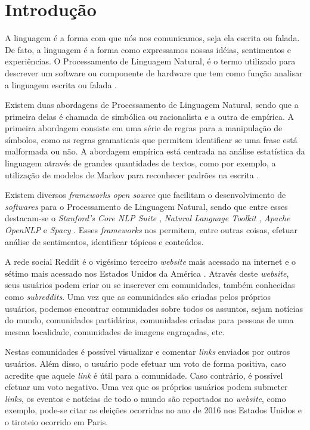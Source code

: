 \chapter{Introdução}
\label{chap:introducao}
A linguagem é a forma com que nós nos comunicamos, seja ela escrita ou
falada. De fato, a linguagem é a forma como
expressamos nossas idéias, sentimentos e experiências. O Processamento de
Linguagem Natural, é o termo utilizado para descrever um software ou componente
de hardware que tem como função analisar a linguagem escrita ou falada
\cite{jacksonmoulinier2007}.

Existem duas abordagens de Processamento de Linguagem Natural, sendo que a
primeira delas é chamada de simbólica ou racionalista e a outra de empírica. A primeira
abordagem consiste em uma série de regras para a manipulação de símbolos, como as regras gramaticais que permitem identificar se uma frase está malformada ou não. A abordagem
empírica está centrada na análise estatística da linguagem através de grandes quantidades
de textos, como por exemplo, a utilização de modelos de Markov para reconhecer padrões
na escrita \cite{jacksonmoulinier2007}.

Existem diversos \textit{frameworks open source} que facilitam o desenvolvimento
de \textit{softwares} para o Processamento de Linguagem Natural, sendo que entre
esses destacam-se o \textit{Stanford's Core NLP Suite} \cite{corenlp}, \textit{Natural Language
Toolkit} \cite{nltk}, \textit{Apache OpenNLP} \cite{opennlp} e \textit{Spacy}
\cite{spacy}.
Esses \textit{frameworks} nos permitem, entre outras coisas, efetuar análise de
sentimentos, identificar tópicos e conteúdos.

A rede social Reddit é o vigésimo terceiro \textit{website} mais acessado na
internet e o sétimo mais acessado nos Estados Unidos da América \cite{alexa}.
Através deste \textit{website}, seus usuários podem criar ou se inscrever em
comunidades, também conhecidas como \textit{subreddits}.
Uma vez que as comunidades são criadas pelos próprios usuários, podemos encontrar
comunidades sobre todos os assuntos, sejam notícias do mundo, comunidades
partidárias, comunidades criadas para pessoas de uma mesma localidade, comunidades
de imagens engraçadas, etc.

Nestas comunidades é possível visualizar e comentar \textit{links} enviados por
outros usuários.
Além disso, o usuário pode efetuar um voto de forma positiva, caso acredite que
aquele \textit{link} é útil para a comunidade. Caso contrário, é possível
efetuar um voto negativo.
Uma vez que os próprios usuários podem submeter \textit{links}, os eventos e
notícias de todo o mundo são reportados no \textit{website}, como exemplo,
pode-se citar as eleições ocorridas no ano de 2016 nos Estados Unidos e o
tiroteio ocorrido em Paris.

